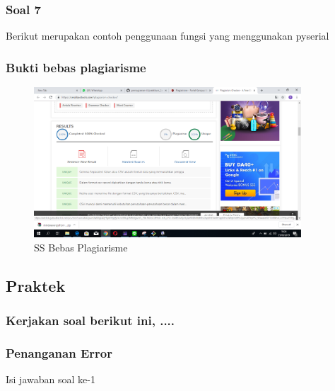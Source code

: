 \subsubsection{Soal 7}


Berikut merupakan contoh penggunaan fungsi yang menggunakan pyserial


\subsubsection{Bukti bebas plagiarisme}
\begin{figure}[h]
\centering
\includegraphics[width=10cm]{figures/5/Teori/1174095/1174095.png}
\caption{SS Bebas Plagiarisme}
\label{dzihan}
\end{figure}

\subsection{Praktek}
\subsubsection{Kerjakan soal berikut ini, ....}
\subsubsection{Penanganan Error}
Isi jawaban soal ke-1

